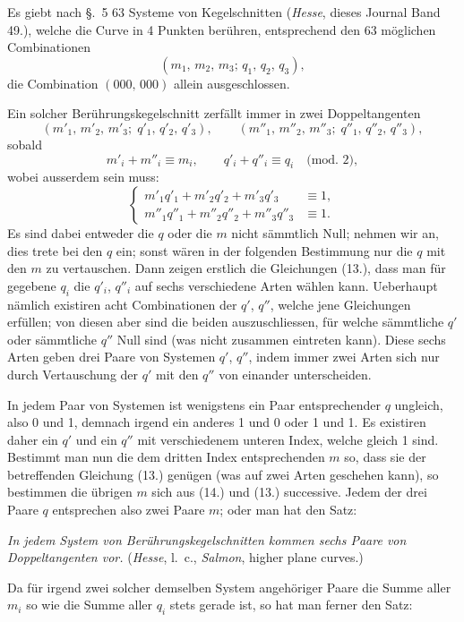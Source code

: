 \documentclass{article}
\begin{document}

Es giebt nach §.~5 63 Systeme von Kegelschnitten (\emph{Hesse}, dieses Journal Band 49.), welche die Curve in 4 Punkten berühren, entsprechend den 63 möglichen Combinationen
\[
(m_{1},\, m_{2},\, m_{3};\, q_{1},\, q_{2},\, q_{3}),
\]
die Combination $(000,\, 000)$ allein ausgeschlossen.

Ein solcher Berührungskegelschnitt zerfällt immer in zwei Doppeltangenten
\[
(m'_{1},\, m'_{2},\, m'_{3};\; q'_{1},\, q'_{2},\, q'_{3}), \qquad (m''_{1},\, m''_{2},\, m''_{3};\; q''_{1},\, q''_{2},\, q''_{3}),
\]
sobald
\[
m'_{i}+m''_{i} \equiv m_{i}, \qquad q'_{i}+q''_{i} \equiv q_{i} \quad \text{(mod.\ 2)}, \tag{13.}
\]
wobei ausserdem sein muss:
\[
\left\{
\begin{aligned}
m'_{1}q'_{1}+m'_{2}q'_{2}+m'_{3}q'_{3} &\equiv 1,\\
m''_{1}q''_{1}+m''_{2}q''_{2}+m''_{3}q''_{3} &\equiv 1.
\end{aligned}
\right. \tag{14.}
\]
Es sind dabei entweder die $q$ oder die $m$ nicht sämmtlich Null; nehmen wir an, dies trete bei den $q$ ein; sonst wären in der folgenden Bestimmung nur die $q$ mit den $m$ zu vertauschen. Dann zeigen erstlich die Gleichungen (13.), dass man für gegebene $q_{i}$ die $q'_{i}$, $q''_{i}$ auf sechs verschiedene Arten wählen kann. Ueberhaupt nämlich existiren acht Combinationen der $q'$, $q''$, welche jene Gleichungen erfüllen; von diesen aber sind die beiden auszuschliessen, für welche sämmtliche $q'$ oder sämmtliche $q''$ Null sind (was nicht zusammen eintreten kann). Diese sechs Arten geben drei Paare von Systemen $q'$, $q''$, indem immer zwei Arten sich nur durch Vertauschung der $q'$ mit den $q''$ von einander unterscheiden.

In jedem Paar von Systemen ist wenigstens ein Paar entsprechender $q$ ungleich, also 0 und 1, demnach irgend ein anderes 1 und 0 oder 1 und 1. Es existiren daher ein $q'$ und ein $q''$ mit verschiedenem unteren Index, welche gleich 1 sind. Bestimmt man nun die dem dritten Index entsprechenden $m$ so, dass sie der betreffenden Gleichung (13.) genügen (was auf zwei Arten geschehen kann), so bestimmen die übrigen $m$ sich aus (14.) und (13.) successive. Jedem der drei Paare $q$ entsprechen also zwei Paare $m$; oder man hat den Satz:

\emph{In jedem System von Berührungskegelschnitten kommen sechs Paare von Doppeltangenten vor.} (\emph{Hesse}, l.\ c., \emph{Salmon}, higher plane curves.)

Da für irgend zwei solcher demselben System angehöriger Paare die Summe aller $m_{i}$ so wie die Summe aller $q_{i}$ stets gerade ist, so hat man ferner den Satz:
\end{document}
